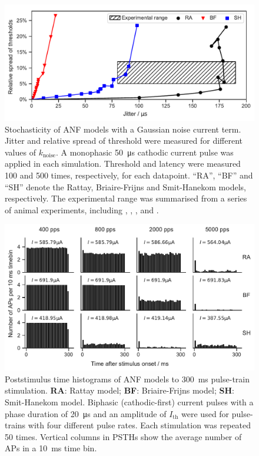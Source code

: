 \documentclass[utf8]{frontiersSCNS} %
\newcommand{\T}[1]{\text{#1}}
\begin{document}
\begin{figure}[h!]
\begin{center}
\includegraphics[width=\linewidth]{images/stochasticity_plot.pdf}
\end{center}
\caption{Stochasticity of ANF models with a Gaussian noise current term. Jitter and relative spread of threshold were measured for different values of $k_{\T{noise}}$. A monophasic \SI{50}{\micro\second} cathodic current pulse was applied in each simulation. Threshold and latency were measured 100 and 500 times, respectively,  for each datapoint.
``RA'', ``BF'' and ``SH'' denote the Rattay, Briaire-Frijns and Smit-Hanekom models, respectively. The experimental range was summarised from a series of animal experiments, including \cite{VandenHonert1984}, \cite{Javel1987}, \cite{Dynes1996}, \cite{Miller1999} and \cite{Cartee2000}.}
\label{fig:stochasticity_plot}
\end{figure}

\begin{figure}[h!]
\begin{center}
\includegraphics[width=\linewidth]{images/psth_plot_comparison_thr.pdf}
\end{center}
\caption{Poststimulus time histograms of ANF models to \SI{300}{\milli\second} pulse-train stimulation. \textbf{RA}: Rattay model; \textbf{BF}: Briaire-Frijns model; \textbf{SH}: Smit-Hanekom model. Biphasic (cathodic-first) current pulses with a phase duration of \SI{20}{\micro\second} and an amplitude of $I_{\T{th}}$ were used for pulse-trains with four different pulse rates. Each stimulation was repeated 50 times. Vertical columns in PSTHs show the average number of APs in a \SI{10}{\milli\second} time bin.}
\label{fig:PSTH_comparison}
\end{figure}
\end{document}
